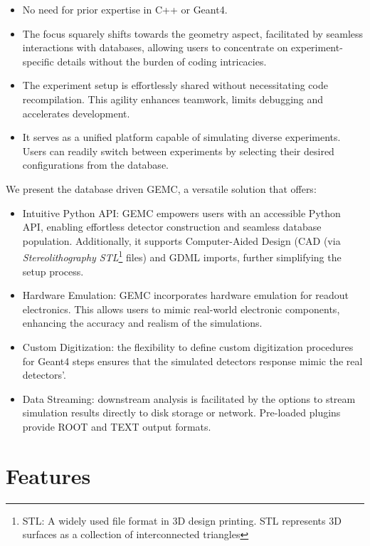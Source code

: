 \begin{itemize}
    \item No need for prior expertise in C++ or Geant4.
    \item The focus squarely shifts towards
    the geometry aspect, facilitated by seamless interactions with databases,
    allowing users to concentrate on experiment-specific details without the burden of coding intricacies.
    \item The experiment setup is effortlessly shared without necessitating code recompilation.
    This agility enhances teamwork, limits debugging and accelerates development.
    \item It serves as a unified platform capable of simulating diverse experiments.
    Users can readily switch between experiments by selecting their desired configurations from the database.
\end{itemize}

\newpage
We present the database driven GEMC\cite{clas12_gemc, gemc_homepage}, a versatile solution that offers:

\begin{itemize}
    \item Intuitive Python API: GEMC empowers users with an accessible Python API, enabling
    effortless detector construction and seamless database population.
    Additionally, it supports Computer-Aided Design (CAD (via \emph{Stereolithography STL}\footnote{STL: A widely used file format
    in 3D design printing. STL represents 3D surfaces as a collection of
    interconnected triangles} files) and GDML imports, further simplifying the setup process.
    \item Hardware Emulation: GEMC incorporates hardware emulation for readout electronics.
    This allows users to mimic real-world electronic components, enhancing the accuracy and realism of
    the simulations.
    \item Custom Digitization: the flexibility to define custom digitization procedures for Geant4 steps
    ensures that the simulated detectors response mimic the real detectors'.
    \item Data Streaming: downstream analysis is facilitated by the options to stream simulation results directly
    to disk storage or network.
    Pre-loaded plugins provide ROOT and TEXT output formats.
\end{itemize}


\section{Features}
\label{sec:features}

